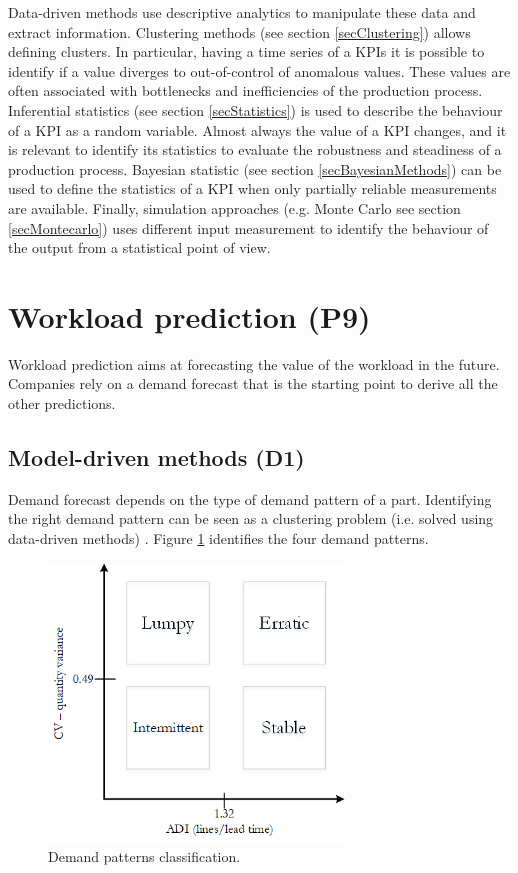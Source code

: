 Data-driven methods use descriptive analytics to manipulate these data and extract information. Clustering methods (see section \ref{secClustering}) allows defining clusters. In particular, having a time series of a KPIs it is possible to identify if a value diverges to out-of-control of anomalous values. These values are often associated with bottlenecks and inefficiencies of the production process. Inferential statistics (see section \ref{secStatistics}) is used to describe the behaviour of a KPI as a random variable. Almost always the value of a KPI changes, and it is relevant to identify its statistics to evaluate the robustness and steadiness of a production process. Bayesian statistic (see section \ref{secBayesianMethods}) can be used to define the statistics of a KPI when only partially reliable measurements are available. Finally, simulation approaches (e.g. Monte Carlo see section \ref{secMontecarlo}) uses different input measurement to identify the behaviour of the output from a statistical point of view.  

\section{Workload prediction (P9)}
Workload prediction aims at forecasting the value of the workload in the future. Companies rely on a demand forecast that is the starting point to derive all the other predictions. 

\subsection{Model-driven methods (D1)} \label{secDemandPatterns}
Demand forecast depends on the type of demand pattern of a part. Identifying the right demand pattern can be seen as a clustering problem (i.e. solved using data-driven methods) \cite{Mikalsen}. Figure \ref{fig_prod_demand_pattern} identifies the four demand patterns.

\begin{figure}[hbt!]
\centering
\includegraphics[width=0.7\textwidth]{sectionProduction/control_figures/fig_prod_demand_pattern.png}
\captionsetup{type=figure}
\caption{Demand patterns classification.}
\label{fig_prod_demand_pattern}
\end{figure}

